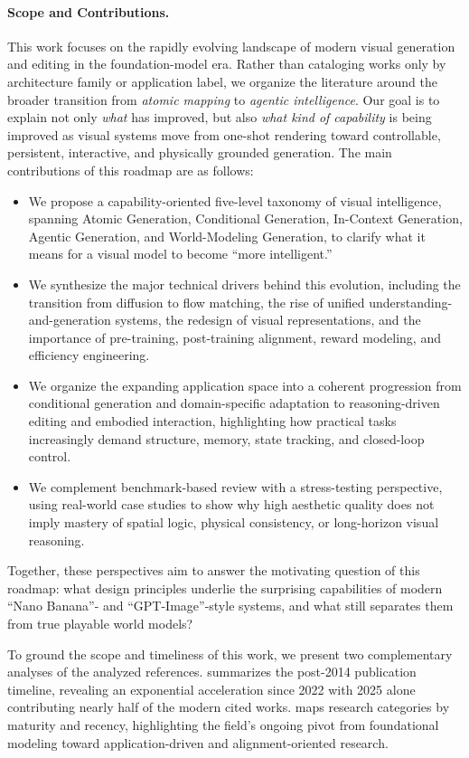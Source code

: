 \paragraph{Scope and Contributions.}
This work focuses on the rapidly evolving landscape of modern visual generation and editing in the foundation-model era. Rather than cataloging works only by architecture family or application label, we organize the literature around the broader transition from \emph{atomic mapping} to \emph{agentic intelligence}. Our goal is to explain not only \emph{what} has improved, but also \emph{what kind of capability} is being improved as visual systems move from one-shot rendering toward controllable, persistent, interactive, and physically grounded generation. The main contributions of this roadmap are as follows:
\begin{itemize}[leftmargin=*]
\item We propose a capability-oriented five-level taxonomy of visual intelligence, spanning Atomic Generation, Conditional Generation, In-Context Generation, Agentic Generation, and World-Modeling Generation, to clarify what it means for a visual model to become ``more intelligent.''
\item We synthesize the major technical drivers behind this evolution, including the transition from diffusion to flow matching, the rise of unified understanding-and-generation systems, the redesign of visual representations, and the importance of pre-training, post-training alignment, reward modeling, and efficiency engineering.
\item We organize the expanding application space into a coherent progression from conditional generation and domain-specific adaptation to reasoning-driven editing and embodied interaction, highlighting how practical tasks increasingly demand structure, memory, state tracking, and closed-loop control.
\item We complement benchmark-based review with a stress-testing perspective, using real-world case studies to show why high aesthetic quality does not imply mastery of spatial logic, physical consistency, or long-horizon visual reasoning.
\end{itemize}
Together, these perspectives aim to answer the motivating question of this roadmap: what design principles underlie the surprising capabilities of modern ``Nano Banana''- and ``GPT-Image''-style systems, and what still separates them from true playable world models?


To ground the scope and timeliness of this work, we present two complementary analyses of the analyzed references.  summarizes the post-2014 publication timeline, revealing an exponential acceleration since 2022 with 2025 alone contributing nearly half of the modern cited works.  maps research categories by maturity and recency, highlighting the field's ongoing pivot from foundational modeling toward application-driven and alignment-oriented research.

